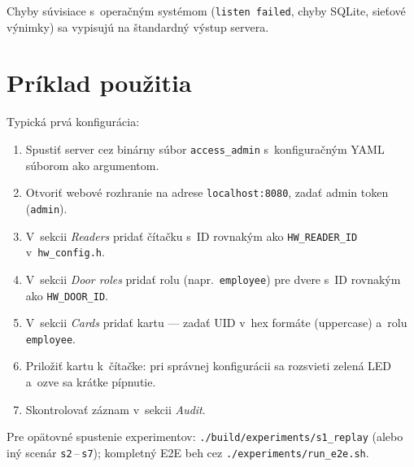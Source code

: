 \documentclass[a4paper]{feidippp}
\begin{document}
\noindent Chyby súvisiace s~operačným systémom (\texttt{listen failed}, chyby SQLite, sieťové výnimky) sa vypisujú na štandardný výstup servera.

\section{Príklad použitia}

Typická prvá konfigurácia:

\begin{enumerate}
\item Spustiť server cez binárny súbor \texttt{access\_admin} s~konfiguračným YAML súborom ako argumentom.
\item Otvoriť webové rozhranie na adrese \texttt{localhost:8080}, zadať admin token (\texttt{admin}).
\item V~sekcii \emph{Readers} pridať čítačku s~ID rovnakým ako \texttt{HW\_READER\_ID} v~\texttt{hw\_config.h}.
\item V~sekcii \emph{Door roles} pridať rolu (napr.\ \texttt{employee}) pre dvere s~ID rovnakým ako \texttt{HW\_DOOR\_ID}.
\item V~sekcii \emph{Cards} pridať kartu --- zadať UID v~hex formáte (uppercase) a~rolu \texttt{employee}.
\item Priložiť kartu k~čítačke: pri správnej konfigurácii sa rozsvieti zelená LED a~ozve sa krátke pípnutie.
\item Skontrolovať záznam v~sekcii \emph{Audit}.
\end{enumerate}

\noindent Pre opätovné spustenie experimentov: \texttt{./build/experiments/s1\_replay} (alebo iný scenár \texttt{s2}\,--\,\texttt{s7}); kompletný E2E beh cez \texttt{./experiments/run\_e2e.sh}.
\end{document}
